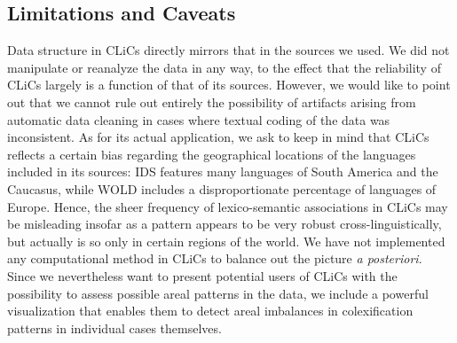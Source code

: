 \subsection{Limitations and Caveats} \label{caveats}

Data structure in CLiCs directly mirrors that in the sources we used. We did not manipulate or
reanalyze the data in any way, to the effect that the reliability of CLiCs largely is a function of
that of its sources. However, we would like to point out that we cannot rule out entirely the
possibility of artifacts arising from automatic data cleaning in cases where textual coding of the
data was inconsistent. As for its actual application, we ask to keep in mind that
CLiCs reflects a certain bias regarding the geographical locations of the languages included in its
sources: IDS features many languages of South America and the Caucasus, while WOLD includes a
disproportionate percentage of languages of Europe. Hence, the sheer frequency of lexico-semantic
associations in CLiCs may be misleading insofar as a pattern appears to be very robust
cross-linguistically, but actually is so only in certain regions of the world. We have not
implemented any computational method in CLiCs to balance out the picture \emph{a posteriori}. Since we
nevertheless want to present potential users of CLiCs with the possibility to assess possible areal
patterns in the data, we include a powerful visualization that enables them to detect areal
imbalances in colexification patterns in individual cases themselves.


